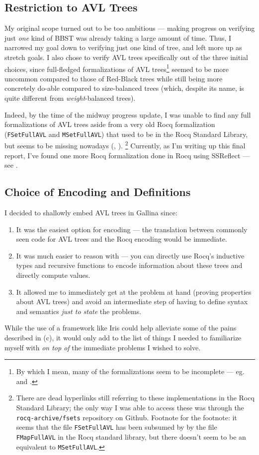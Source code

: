 \documentclass[acmsmall, authorversion, nonacm, overload]{acmart}
\begin{document}
\subsection{Restriction to AVL Trees}
My original scope turned out to be too ambitious --- making progress on verifying just \emph{one}
kind of BBST was already taking a large amount of time.
Thus, I narrowed my goal down to verifying just one kind of tree, and left more up as stretch goals.
I also chose to verify AVL trees specifically out of the three initial choices,
since full-fledged formalizations of AVL trees\footnote{
  By which I mean, many of the formalizations seem to be incomplete --- eg.\ \cite{AVL-Lean} and \cite{AVL-Coq-fail}.
} seemed to be more uncommon compared to those of Red-Black trees
while still being more concretely do-able compared to size-balanced trees (which, despite its name, is
quite different from \emph{weight}-balanced trees).

Indeed, by the time of the midway progress update,
I was unable to find any full formalizations of AVL trees aside from
a very old Rocq formalization (\verb|FSetFullAVL| and \verb|MSetFullAVL|)
that used to be in the Rocq Standard Library, but seems to be missing nowadays (\cite{AVL-coq}, \cite{rocq-archive}).
\footnote{
There are dead hyperlinks still referring to these implementations in the Rocq Standard Library;
the only way I was able to access these was through the \texttt{rocq-archive/fsets} repository on Github.
Footnote for the footnote: it seems that the file \texttt{FSetFullAVL} has been subsumed by
by the file \texttt{FMapFullAVL} in the Rocq standard library, but there doesn't seem to be an equivalent
to \texttt{MSetFullAVL}.
}
Currently, as I'm writing up this final report, I've found one more
Rocq formalization done in Rocq using SSReflect --- see \cite{AVL-ssreflect}.

\subsection{Choice of Encoding and Definitions}
I decided to shallowly embed AVL trees in Gallina since:
\begin{enumerate}[label=(\alph*)]
\item It was the easiest option for encoding --- the translation between
  commonly seen code for AVL trees and the Rocq encoding would be immediate.
\item It was much easier to reason with --- you can directly use Rocq's inductive types and recursive functions
  to encode information about these trees and directly compute values.
\item It allowed me to immediately get at the problem at hand (proving properties about AVL trees)
  and avoid an intermediate step of having to define syntax and semantics \emph{just to state} the problems.
\end{enumerate}
While the use of a framework like Iris could help alleviate some of the pains described in (c),
it would only add to the list of things I needed to familiarize myself with \emph{on top of}
the immediate problems I wished to solve.
\end{document}
